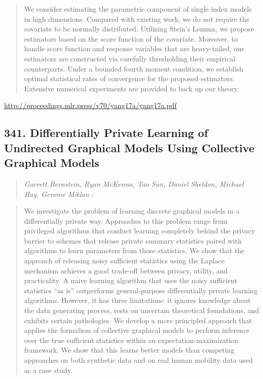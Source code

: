 \documentclass{article}
\begin{document}
\begin{quote}
    We consider estimating the parametric component of single index models in high dimensions. Compared with existing work, we do not require the covariate to be normally distributed. Utilizing Stein’s Lemma, we propose estimators based on the score function of the covariate. Moreover, to handle score function and response variables that are heavy-tailed, our estimators are constructed via carefully thresholding their empirical counterparts. Under a bounded fourth moment condition, we establish optimal statistical rates of convergence for the proposed estimators. Extensive numerical experiments are provided to back up our theory.  
\end{quote}

\href{http://proceedings.mlr.press/v70/yang17a/yang17a.pdf}{http://proceedings.mlr.press/v70/yang17a/yang17a.pdf}

\subsection{341. Differentially Private Learning of Undirected Graphical Models Using Collective Graphical Models}

\begin{quote}
\footnotesize{\textit{Garrett Bernstein, Ryan McKenna, Tao Sun, Daniel Sheldon, Michael Hay, Gerome Miklau ;}}

\end{quote}

\begin{quote}
    We investigate the problem of learning discrete graphical models in a differentially private way. Approaches to this problem range from privileged algorithms that conduct learning completely behind the privacy barrier to schemes that release private summary statistics paired with algorithms to learn parameters from those statistics. We show that the approach of releasing noisy sufficient statistics using the Laplace mechanism achieves a good trade-off between privacy, utility, and practicality. A naive learning algorithm that uses the noisy sufficient statistics “as is” outperforms general-purpose differentially private learning algorithms. However, it has three limitations: it ignores knowledge about the data generating process, rests on uncertain theoretical foundations, and exhibits certain pathologies. We develop a more principled approach that applies the formalism of collective graphical models to perform inference over the true sufficient statistics within an expectation-maximization framework. We show that this learns better models than competing approaches on both synthetic data and on real human mobility data used as a case study.  
\end{quote}
\end{document}
